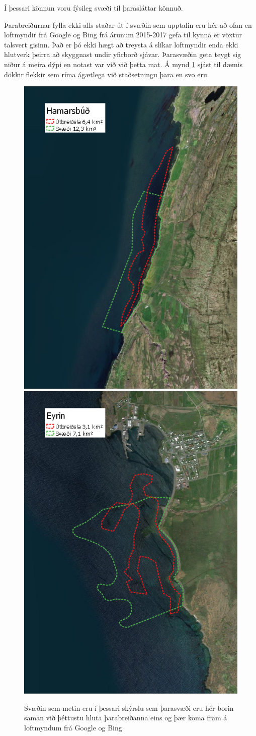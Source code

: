 \documentclass[icelandic,]{book}
\begin{document}
Í þessari könnun voru fýsileg svæði til þarasláttar könnuð.

Þarabreiðurnar fylla ekki alls staðar út í svæðin sem upptalin eru hér að ofan en loftmyndir frá Google og Bing frá árunum 2015-2017 gefa til kynna er vöxtur talsvert gisinn. Það er þó ekki hægt að treysta á slíkar loftmyndir enda ekki hlutverk þeirra að skyggnast undir yfirborð sjávar. Þarasvæðin geta teygt sig niður á meira dýpi en notast var við við þetta mat. Á mynd \ref{fig:svaediogskogar} sjást til dæmis dökkir flekkir sem ríma ágætlega við staðsetningu þara en svo eru\\

\begin{figure}

{\centering \includegraphics[width=0.5\linewidth]{myndir/feltkort/hamarsb} \includegraphics[width=0.5\linewidth]{myndir/feltkort/eyri} 

}

\caption{Svæðin sem metin eru í þessari skýrslu sem þarasvæði eru hér borin saman við þéttustu hluta þarabreiðanna eins og þær koma fram á loftmyndum frá Google og Bing}\label{fig:svaediogskogar}
\end{figure}
\end{document}

